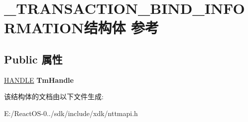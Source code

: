 \hypertarget{struct___t_r_a_n_s_a_c_t_i_o_n___b_i_n_d___i_n_f_o_r_m_a_t_i_o_n}{}\section{\+\_\+\+T\+R\+A\+N\+S\+A\+C\+T\+I\+O\+N\+\_\+\+B\+I\+N\+D\+\_\+\+I\+N\+F\+O\+R\+M\+A\+T\+I\+O\+N结构体 参考}
\label{struct___t_r_a_n_s_a_c_t_i_o_n___b_i_n_d___i_n_f_o_r_m_a_t_i_o_n}
\subsection*{Public 属性}
\begin{DoxyCompactItemize}
\item 
\mbox{\label{struct___t_r_a_n_s_a_c_t_i_o_n___b_i_n_d___i_n_f_o_r_m_a_t_i_o_n_a1df93b435b12140acc5dbcef27e28710}} 
\hyperlink{interfacevoid}{H\+A\+N\+D\+LE} {\bfseries Tm\+Handle}
\end{DoxyCompactItemize}


该结构体的文档由以下文件生成\+:\begin{DoxyCompactItemize}
\item 
E\+:/\+React\+O\+S-\/0../sdk/include/xdk/nttmapi.\+h\end{DoxyCompactItemize}
